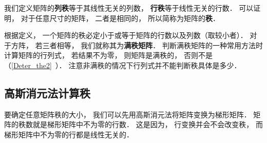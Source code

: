 

我们定义矩阵的\textbf{列秩}等于其线性无关的列数， \textbf{行秩}等于线性无关的行数． 可以证明， 对于任意尺寸的矩阵， 二者是相同的， 所以简称为矩阵的\textbf{秩}．

根据定义， 一个矩阵的秩必定小于或等于矩阵的行数以及列数（取较小者）． 对于方阵， 若三者相等， 我们就称其为\textbf{满秩矩阵}． 判断满秩矩阵的一种常用方法时计算矩阵的行列式， 若结果不为零， 则矩阵是满秩的， 否则不是（\autoref{Deter_the2}~）． 注意非满秩的情况下行列式并不能判断秩具体是多少．


\subsection{高斯消元法计算秩}
要确定任意矩阵秩的大小， 我们可以先用高斯消元法将矩阵变换为梯形矩阵． 矩阵的秩数就是梯形矩阵中不为零的行数． 这是因为， 行变换并会不会改变秩， 而梯形矩阵中不为零的行都是线性无关的．
